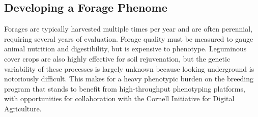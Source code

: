 \documentclass[11pt]{article}
\newcommand{\nicholas}[1]{{\color{nicholasCol} [\textbf{NS:} #1 (\today\ \currenttime)]}}
\begin{document}





\subsection*{Developing a Forage Phenome}

Forages are typically harvested multiple times per year and are often perennial, requiring several years of evaluation. Forage quality must be measured to gauge animal nutrition and digestibility, but is expensive to phenotype. Leguminous cover crops are also highly effective for soil rejuvenation, but the genetic variability of these processes is largely unknown because looking underground is notoriously difficult. This makes for a heavy phenotypic burden on the breeding program that stands to benefit from high-throughput phenotyping platforms, with opportunities for collaboration with the Cornell Initiative for Digital Agriculture.
\end{document}
